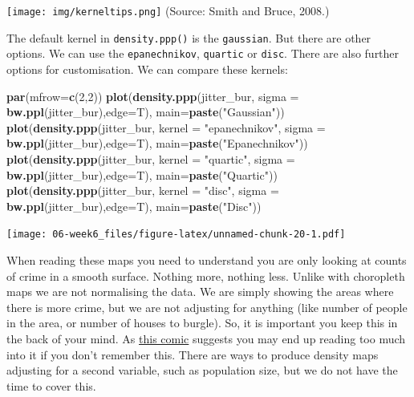 \documentclass[]{book}
\newenvironment{Shaded}{\begin{snugshade}}{\end{snugshade}}
\newcommand{\DataTypeTok}[1]{\textcolor[rgb]{0.13,0.29,0.53}{#1}}
\newcommand{\DecValTok}[1]{\textcolor[rgb]{0.00,0.00,0.81}{#1}}
\newcommand{\KeywordTok}[1]{\textcolor[rgb]{0.13,0.29,0.53}{\textbf{#1}}}
\newcommand{\NormalTok}[1]{#1}
\newcommand{\StringTok}[1]{\textcolor[rgb]{0.31,0.60,0.02}{#1}}
\begin{document}
\texttt{[image: img/kerneltips.png]}
(Source: Smith and Bruce, 2008.)

The default kernel in \texttt{density.ppp()} is the \texttt{gaussian}. But there are other options. We can use the \texttt{epanechnikov}, \texttt{quartic} or \texttt{disc}. There are also further options for customisation. We can compare these kernels:

\begin{Shaded}
\begin{Highlighting}[]
\KeywordTok{par}\NormalTok{(}\DataTypeTok{mfrow=}\KeywordTok{c}\NormalTok{(}\DecValTok{2}\NormalTok{,}\DecValTok{2}\NormalTok{))}
\KeywordTok{plot}\NormalTok{(}\KeywordTok{density.ppp}\NormalTok{(jitter_bur, }\DataTypeTok{sigma =} \KeywordTok{bw.ppl}\NormalTok{(jitter_bur),}\DataTypeTok{edge=}\NormalTok{T),}
     \DataTypeTok{main=}\KeywordTok{paste}\NormalTok{(}\StringTok{"Gaussian"}\NormalTok{))}
\KeywordTok{plot}\NormalTok{(}\KeywordTok{density.ppp}\NormalTok{(jitter_bur, }\DataTypeTok{kernel =} \StringTok{"epanechnikov"}\NormalTok{, }\DataTypeTok{sigma =} \KeywordTok{bw.ppl}\NormalTok{(jitter_bur),}\DataTypeTok{edge=}\NormalTok{T),}
     \DataTypeTok{main=}\KeywordTok{paste}\NormalTok{(}\StringTok{"Epanechnikov"}\NormalTok{))}
\KeywordTok{plot}\NormalTok{(}\KeywordTok{density.ppp}\NormalTok{(jitter_bur, }\DataTypeTok{kernel =} \StringTok{"quartic"}\NormalTok{, }\DataTypeTok{sigma =} \KeywordTok{bw.ppl}\NormalTok{(jitter_bur),}\DataTypeTok{edge=}\NormalTok{T),}
     \DataTypeTok{main=}\KeywordTok{paste}\NormalTok{(}\StringTok{"Quartic"}\NormalTok{))}
\KeywordTok{plot}\NormalTok{(}\KeywordTok{density.ppp}\NormalTok{(jitter_bur, }\DataTypeTok{kernel =} \StringTok{"disc"}\NormalTok{, }\DataTypeTok{sigma =} \KeywordTok{bw.ppl}\NormalTok{(jitter_bur),}\DataTypeTok{edge=}\NormalTok{T),}
     \DataTypeTok{main=}\KeywordTok{paste}\NormalTok{(}\StringTok{"Disc"}\NormalTok{))}
\end{Highlighting}
\end{Shaded}

\texttt{[image: 06-week6\_files/figure-latex/unnamed-chunk-20-1.pdf]}

When reading these maps you need to understand you are only looking at counts of crime in a smooth surface. Nothing more, nothing less. Unlike with choropleth maps we are not normalising the data. We are simply showing the areas where there is more crime, but we are not adjusting for anything (like number of people in the area, or number of houses to burgle). So, it is important you keep this in the back of your mind. As \href{https://xkcd.com/1138/}{this comic} suggests you may end up reading too much into it if you don't remember this. There are ways to produce density maps adjusting for a second variable, such as population size, but we do not have the time to cover this.
\end{document}
